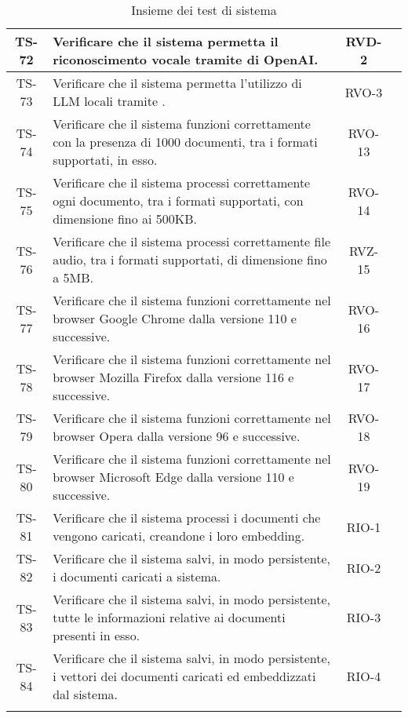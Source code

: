 \begin{xltabular}{\textwidth}{| c | X | c | c |}
    \hline
    TS-72 & Verificare che il sistema permetta il riconoscimento vocale tramite  di OpenAI. & RVD-2 & \textcolor{xmarkcolor}{}\\
    \hline
    TS-73 & Verificare che il sistema permetta l'utilizzo di LLM locali tramite . & RVO-3 & \textcolor{cmarkcolor}{} \\
    \hline
    TS-74 & Verificare che il sistema funzioni correttamente con la presenza di 1000 documenti, tra i formati supportati, in esso. & RVO-13 & \textcolor{cmarkcolor}{}\\
    \hline
    TS-75 & Verificare che il sistema processi correttamente ogni documento, tra i formati supportati, con dimensione fino ai 500KB. & RVO-14 & \textcolor{cmarkcolor}{} \\
    \hline
    TS-76 & Verificare che il sistema processi correttamente file audio, tra i formati supportati, di dimensione fino a 5MB. & RVZ-15 & \textcolor{cmarkcolor}{} \\
    \hline
    TS-77 & Verificare che il sistema funzioni correttamente nel browser Google Chrome dalla versione 110 e successive. & RVO-16 & \textcolor{cmarkcolor}{} \\
    \hline
    TS-78 & Verificare che il sistema funzioni correttamente nel browser Mozilla Firefox dalla versione 116 e successive. & RVO-17 & \textcolor{cmarkcolor}{} \\
    \hline
    TS-79 & Verificare che il sistema funzioni correttamente nel browser Opera dalla versione 96 e successive. & RVO-18 & \textcolor{cmarkcolor}{} \\
    \hline
    TS-80 & Verificare che il sistema funzioni correttamente nel browser Microsoft Edge dalla versione 110 e successive. & RVO-19 & \textcolor{cmarkcolor}{} \\
    \hline
    TS-81 & Verificare che il sistema processi i documenti che vengono caricati, creandone i loro embedding. & RIO-1 & \textcolor{cmarkcolor}{} \\
    \hline
    TS-82 & Verificare che il sistema salvi, in modo persistente, i documenti caricati a sistema. & RIO-2 & \textcolor{cmarkcolor}{} \\
    \hline
    TS-83 & Verificare che il sistema salvi, in modo persistente, tutte le informazioni relative ai documenti presenti in esso. & RIO-3 & \textcolor{cmarkcolor}{} \\
    \hline
    TS-84 & Verificare che il sistema salvi, in modo persistente, i vettori dei documenti caricati ed embeddizzati dal sistema. & RIO-4 & \textcolor{cmarkcolor}{} \\
    \hline
     \caption{Insieme dei test di sistema}
    \label{tab:test}
\end{xltabular}
\endgroup

